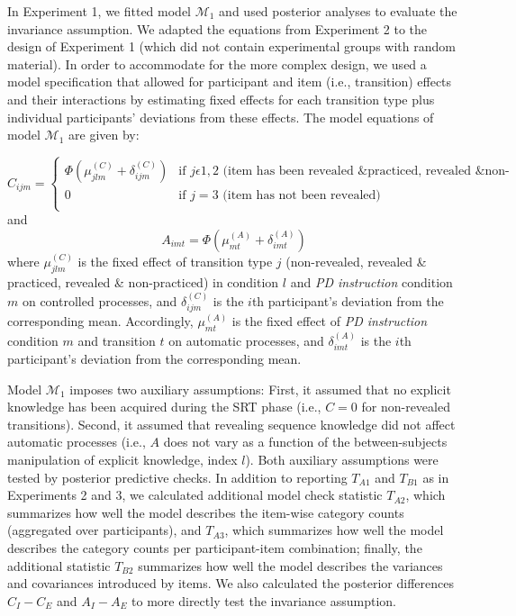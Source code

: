 \documentclass[english,,man]{apa6}
\begin{document}
\begin{appendix}
In Experiment 1, we fitted model \(\mathcal{M}_1\) and used posterior
analyses to evaluate the invariance assumption. We adapted the equations
from Experiment 2 to the design of Experiment 1 (which did not contain
experimental groups with random material). In order to accommodate for
the more complex design, we used a model specification that allowed for
participant and item (i.e., transition) effects and their interactions
by estimating fixed effects for each transition type plus individual
participants' deviations from these effects. The model equations of
model \(\mathcal{M}_1\) are given by:

\[
C_{ijm} = \begin{cases}
\Phi(\mu_{jlm}^{(C)} + \delta_{ijm}^{(C)}) & \text{if } j \epsilon 1, 2 \text{ (item has been revealed \& practiced, revealed \& non-practiced)}\\
0 & \text{if }j=3 \text{ (item has not been revealed)}\\
\end{cases}
\] and \[
A_{imt} = \Phi(\mu_{mt}^{(A)} + \delta_{imt}^{(A)})
\] where \(\mu_{jlm}^{(C)}\) is the fixed effect of transition type
\(j\) (non-revealed, revealed \& practiced, revealed \& non-practiced)
in condition \(l\) and \emph{PD instruction} condition \(m\) on
controlled processes, and \(\delta_{ijm}^{(C)}\) is the \(i\)th
participant's deviation from the corresponding mean. Accordingly,
\(\mu_{mt}^{(A)}\) is the fixed effect of \emph{PD instruction}
condition \(m\) and transition \(t\) on automatic processes, and
\(\delta_{imt}^{(A)}\) is the \(i\)th participant's deviation from the
corresponding mean.

Model \(\mathcal{M}_1\) imposes two auxiliary assumptions: First, it
assumed that no explicit knowledge has been acquired during the SRT
phase (i.e., \(C=0\) for non-revealed transitions). Second, it assumed
that revealing sequence knowledge did not affect automatic processes
(i.e., \(A\) does not vary as a function of the between-subjects
manipulation of explicit knowledge, index \(l\)). Both auxiliary
assumptions were tested by posterior predictive checks. In addition to
reporting \(T_{A1}\) and \(T_{B1}\) as in Experiments 2 and 3, we
calculated additional model check statistic \(T_{A2}\), which summarizes
how well the model describes the item-wise category counts (aggregated
over participants), and \(T_{A3}\), which summarizes how well the model
describes the category counts per participant-item combination; finally,
the additional statistic \(T_{B2}\) summarizes how well the model
describes the variances and covariances introduced by items. We also
calculated the posterior differences \(C_I - C_E\) and \(A_I - A_E\) to
more directly test the invariance assumption.


\end{appendix}
\end{document}
